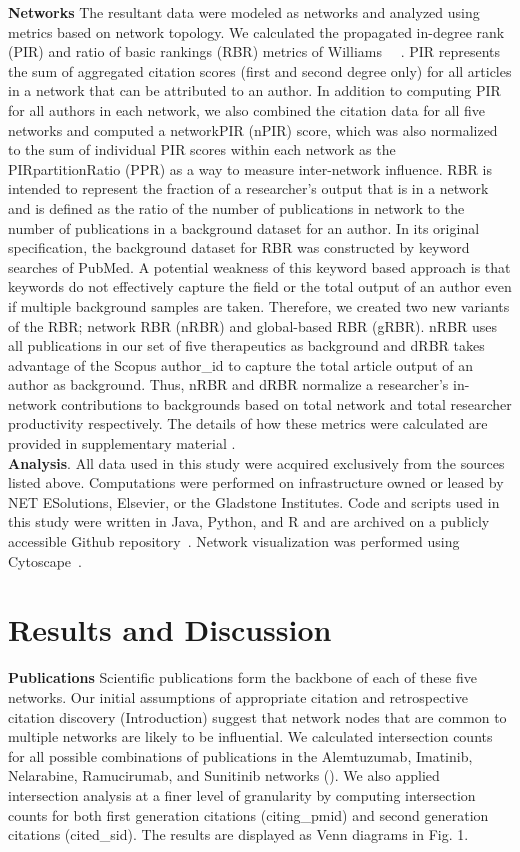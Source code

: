 \documentclass[10pt,letterpaper]{article}
\begin{document}
\textbf{Networks} The resultant data were modeled as networks and analyzed using metrics based on network topology. We calculated the propagated in-degree rank (PIR) and ratio of basic rankings (RBR) metrics of Williams ~~\cite{bibWilliams}. PIR represents the sum of aggregated citation scores (first and second degree only)  for all articles in a network that can be attributed to an author. In addition to computing PIR for all authors in each network, we also combined the citation data for all five networks and computed a networkPIR (nPIR) score, which was also normalized to the sum of individual PIR scores within each network as the PIRpartitionRatio (PPR) as a way to measure inter-network influence. RBR is intended to represent the fraction of a researcher's output that is in a network and is defined as the ratio of the number of publications in network to the number of publications in a background dataset for an author. In its original specification, the background dataset for RBR was constructed by keyword searches of PubMed. A potential weakness of this keyword based approach is that keywords do not effectively capture the field or the total output of an author even if multiple background samples are taken. Therefore, we created two new variants of the RBR; network RBR (nRBR) and global-based RBR (gRBR). nRBR uses all publications in our set of five therapeutics as background and dRBR takes advantage of the Scopus author\_id to capture the total article output of an author as background. Thus, nRBR and dRBR normalize a researcher's in-network contributions to backgrounds based on total network and total researcher productivity respectively. The details of how these metrics were calculated are provided in supplementary material .\\

\textbf{Analysis}. All data used in this study were acquired exclusively from the sources listed above. Computations were performed on infrastructure owned or leased by NET ESolutions, Elsevier, or the Gladstone Institutes. Code and scripts used in this study were written in Java, Python, and R and are archived on a publicly accessible Github repository~\cite{bibGithub}.  Network visualization was performed using Cytoscape~\cite{bibCytoscape}.

\section*{Results and Discussion} 
\textbf{Publications} Scientific publications form the backbone of each of these five networks. Our initial assumptions of appropriate citation and retrospective citation discovery (Introduction) suggest that network nodes that are common to multiple networks are likely to be influential. We calculated intersection counts for all possible combinations of publications in the Alemtuzumab, Imatinib, Nelarabine, Ramucirumab, and Sunitinib networks (). We also applied intersection analysis at a finer level of granularity by computing intersection counts for both first generation citations (citing\_pmid) and second generation citations (cited\_sid). The results are displayed as Venn diagrams in Fig. 1. 
\end{document}

